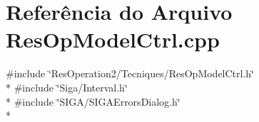 \section{Referência do Arquivo Res\+Op\+Model\+Ctrl.\+cpp}
\label{_res_op_model_ctrl_8cpp}
{\ttfamily \#include \char`\"{}Res\+Operation2/\+Tecniques/\+Res\+Op\+Model\+Ctrl.\+h\char`\"{}}\\*
{\ttfamily \#include \char`\"{}Siga/\+Interval.\+h\char`\"{}}\\*
{\ttfamily \#include \char`\"{}S\+I\+G\+A/\+S\+I\+G\+A\+Errors\+Dialog.\+h\char`\"{}}\\*

